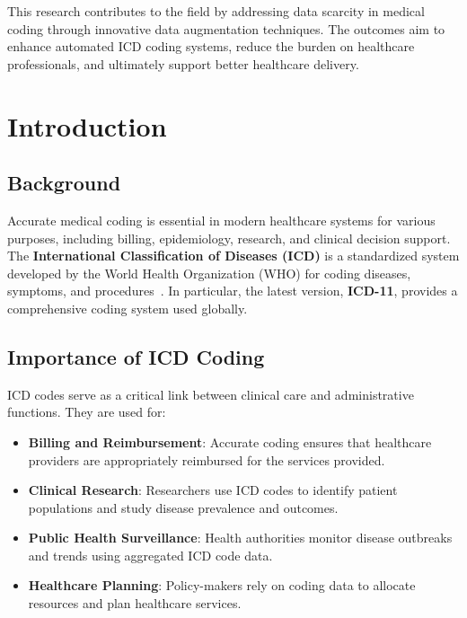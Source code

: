 \documentclass[12pt,a4paper]{report}
\begin{document}
This research contributes to the field by addressing data scarcity in medical coding through innovative data augmentation techniques. The outcomes aim to enhance automated ICD coding systems, reduce the burden on healthcare professionals, and ultimately support better healthcare delivery.

\tableofcontents
\newpage


\chapter{Introduction}

\section{Background}
Accurate medical coding is essential in modern healthcare systems for various purposes, including billing, epidemiology, research, and clinical decision support. The \textbf{International Classification of Diseases (ICD)} is a standardized system developed by the World Health Organization (WHO) for coding diseases, symptoms, and procedures~\cite{who2019icd11}. In particular, the latest version, \textbf{ICD-11}, provides a comprehensive coding system used globally.

\section{Importance of ICD Coding}
ICD codes serve as a critical link between clinical care and administrative functions. They are used for:
\begin{itemize}
    \item \textbf{Billing and Reimbursement}: Accurate coding ensures that healthcare providers are appropriately reimbursed for the services provided.
    \item \textbf{Clinical Research}: Researchers use ICD codes to identify patient populations and study disease prevalence and outcomes.
    \item \textbf{Public Health Surveillance}: Health authorities monitor disease outbreaks and trends using aggregated ICD code data.
    \item \textbf{Healthcare Planning}: Policy-makers rely on coding data to allocate resources and plan healthcare services.
\end{itemize}
\end{document}
